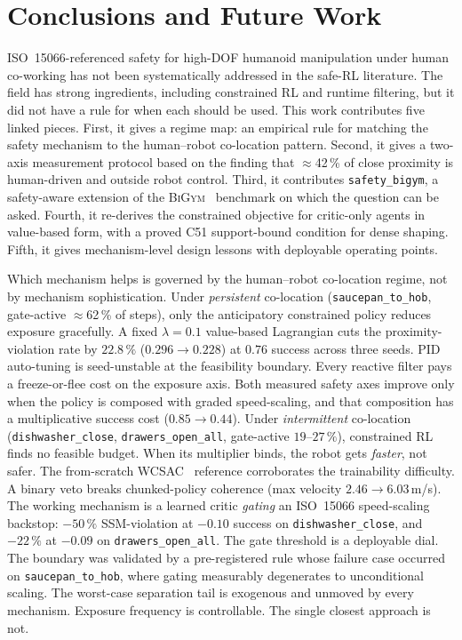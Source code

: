 \documentclass[11pt,a4paper]{report}
\newcommand{\ssm}{SSM}
\newcommand{\iso}{ISO~15066}
\newcommand{\bigym}{\textsc{BiGym}}
\newcommand{\sbigym}{\texttt{safety\_bigym}}
\begin{document}
\chapter{Conclusions and Future Work}
\label{ch:conclusion}

\noindent
\iso{}-referenced safety for high-DOF humanoid manipulation under
human co-working has not been systematically addressed in the safe-RL
literature. The field has strong ingredients, including constrained RL
and runtime filtering, but it did not have a rule for when each should
be used. This work contributes five linked pieces. First, it gives a
regime map: an empirical rule for matching the safety mechanism to the
human--robot co-location pattern. Second, it gives a two-axis
measurement protocol based on the finding that $\approx$42\,\% of close
proximity is human-driven and outside robot control. Third, it
contributes \sbigym{}, a safety-aware extension of the
\bigym{}~\cite{chernyadev2024bigym} benchmark on which the question can
be asked. Fourth, it re-derives the constrained objective for
critic-only agents in value-based form, with a proved C51 support-bound
condition for dense shaping. Fifth, it gives mechanism-level design
lessons with deployable operating points.

\noindent
Which mechanism helps is governed by the human--robot co-location
regime, not by mechanism sophistication. Under \emph{persistent}
co-location (\texttt{saucepan\_to\_hob}, gate-active
$\approx$62\,\% of steps), only the anticipatory constrained policy
reduces exposure gracefully. A fixed $\lambda = 0.1$ value-based
Lagrangian cuts the proximity-violation rate by $22.8\,\%$
($0.296 \to 0.228$) at $0.76$ success across three seeds. PID
auto-tuning is seed-unstable at the feasibility boundary. Every
reactive filter pays a freeze-or-flee cost on the exposure axis. Both
measured safety axes improve only when the policy is composed with
graded speed-scaling, and that composition has a multiplicative
success cost ($0.85 \to 0.44$). Under \emph{intermittent} co-location
(\texttt{dishwasher\_close}, \texttt{drawers\_open\_all}, gate-active
$19$--$27\,\%$), constrained RL finds no feasible budget. When its
multiplier binds, the robot gets \emph{faster}, not safer. The
from-scratch WCSAC~\cite{yang2021wcsac} reference corroborates the
trainability difficulty. A binary veto breaks chunked-policy coherence
(max velocity $2.46 \to 6.03$\,m/s). The working mechanism is a learned
critic \emph{gating} an \iso{} speed-scaling backstop:
$-50\,\%$ \ssm{}-violation at $-0.10$ success on
\texttt{dishwasher\_close}, and $-22\,\%$ at $-0.09$ on
\texttt{drawers\_open\_all}. The gate threshold is a deployable
dial. The boundary was validated by a pre-registered rule whose failure
case occurred on \texttt{saucepan\_to\_hob}, where gating measurably degenerates to
unconditional scaling. The worst-case separation tail is exogenous and
unmoved by every mechanism. Exposure frequency is controllable. The
single closest approach is not.
\end{document}

